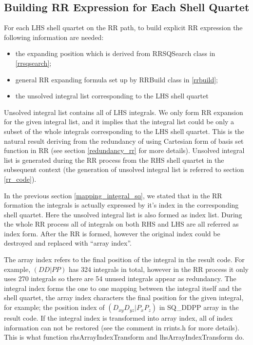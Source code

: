 \subsection{Building RR Expression for Each Shell Quartet}
%
%
%
For each LHS shell quartet on the RR path, to build explicit RR expression
the following information are needed:
\begin{itemize}
 \item the expanding position which is derived from RRSQSearch class in 
 \ref{rrsqsearch};
 \item general RR expanding formula set up by RRBuild class in \ref{rrbuild};
 \item the unsolved integral list corresponding to the LHS shell quartet 
\end{itemize}
Unsolved integral list contains all of LHS integrals. We only form RR expansion
for the given integral list, and it implies that the integral list could be 
only a subset of the whole integrals corresponding to the LHS shell quartet.
This is the natural result deriving from the redundancy of using Cartesian
form of basis set function in RR (see section \ref{redundancy_rr} for more
details). Unsolved integral list is generated during the RR process from
the RHS shell quartet in the subsequent context (the generation of unsolved
integral list is referred to section \ref{rr_code}).

In the previous section \ref{mapping_integral_sq}, we stated that
in the RR formation the integrals is actually expressed by it's index
in the corresponding shell quartet. Here the unsolved integral list
is also formed as index list. During the whole RR process all of integrals
on both RHS and LHS are all referred as index form. After the RR is formed,
however the original index could be destroyed and replaced with ``array index''.

The array index refers to the final position of the integral in the result
code. For example, $(DD|PP)$ has 324 integrals in total, however in the RR
process it only uses 270 integrals so there are 54 unused integrals appear
as redundancy. The integral index forms the one to one mapping between  
the integral itself and the shell quartet, the array index characters the 
final position for the given integral, for example; the position index of 
$(D_{xy}D_{yz}|P_{x}P_{z})$ in SQ\_DDPP array in the result code. If the 
integral index is transformed into array index, all of index information
can not be restored (see the comment in rrints.h for more details). This 
is what function rhsArrayIndexTransform and lhsArrayIndexTransform do.

